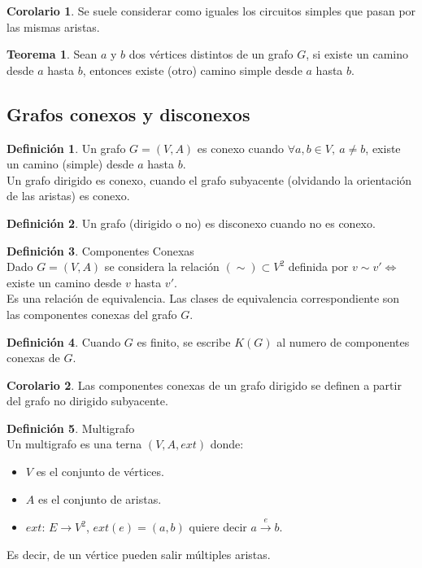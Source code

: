 \documentclass[10pt]{article}
\theoremstyle{definition}
\newtheorem{definition}{Definición}[section]
\newtheorem{theorem}{Teorema}[section]
\newtheorem{corollary}{Corolario}[theorem]
\begin{document}
    \begin{corollary}
        Se suele considerar como iguales los circuitos simples que pasan por las mismas aristas.
    \end{corollary}
    \begin{theorem}
        Sean $a$ y $b$ dos vértices distintos de un grafo $G$, si existe un camino desde $a$ hasta $b$, entonces existe (otro) camino simple desde $a$ hasta $b$.
    \end{theorem}
    \subsection{Grafos conexos y disconexos}
    \begin{definition}
        Un grafo $G=(V,A)$ es conexo cuando $\forall a,b\in V,\ a\neq b$, existe un camino (simple) desde $a$ hasta $b$.\\
        Un grafo dirigido es conexo, cuando el grafo subyacente (olvidando la orientación de las aristas) es conexo.
    \end{definition}
    \begin{definition}
        Un grafo (dirigido o no) es disconexo cuando no es conexo.
    \end{definition}
    \begin{definition}{Componentes Conexas}
        \\Dado $G=(V,A)$ se considera la relación $(\sim)\subset V^2$ definida por $v\sim v'\Leftrightarrow$ existe un camino desde $v$ hasta $v'$.\\Es una relación de equivalencia. Las clases de equivalencia correspondiente son las componentes conexas del grafo $G$.
    \end{definition}
    \begin{definition}
        Cuando $G$ es finito, se escribe $K(G)$ al numero de componentes conexas de $G$.
    \end{definition}
    \begin{corollary}
        Las componentes conexas de un grafo dirigido se definen a partir del grafo no dirigido subyacente.
    \end{corollary}
    \begin{definition}{Multigrafo}
        \\Un multigrafo es una terna $(V,A,ext)$ donde:
        \begin{itemize}
            \item $V$ es el conjunto de vértices.
            \item $A$ es el conjunto de aristas.
            \item $ext$: $E\to V^2$, $ext(e)=(a,b)$ quiere decir $a\xrightarrow{e} b$.
        \end{itemize}
        Es decir, de un vértice pueden salir múltiples aristas.
    \end{definition}
\end{document}
